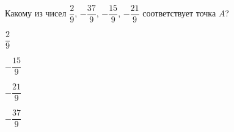 \begin{ex}
	Какому из чисел $\dfrac{2}{9}$, $-\dfrac{37}{9}$, $-\dfrac{15}{9}$, $-\dfrac{21}{9}$ соответствует точка $A$?
	
	\selectanswer
	\begin{enumcols}[columns=4]
		\item $\dfrac{2}{9}$
		\item $-\dfrac{15}{9}$
		\item $-\dfrac{21}{9}$
		\item $-\dfrac{37}{9}$
	\end{enumcols}
\end{ex}